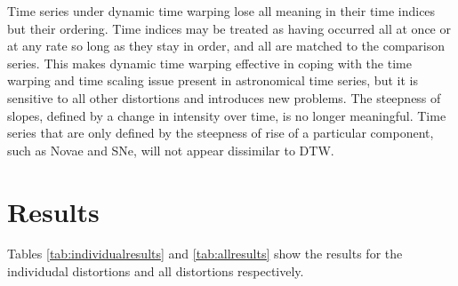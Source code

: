 \documentclass[10pt]{article}
\begin{document}
	Time series under dynamic time warping lose all meaning in their time indices but their ordering. Time indices may be treated as having occurred all at once or at any rate so long as they stay in order, and all are matched to the comparison series. This makes dynamic time warping effective in coping with the time warping and time scaling issue present in astronomical time series, but it is sensitive to all other distortions and introduces new problems. The steepness of slopes, defined by a change in intensity over time, is no longer meaningful. Time series that are only defined by the steepness of rise of a particular component, such as Novae and SNe, will not appear dissimilar to DTW.
	
	\section{Results}
	Tables \ref{tab:individualresults} and \ref{tab:allresults} show the results for the individudal distortions and all distortions respectively.
	
\end{document}
